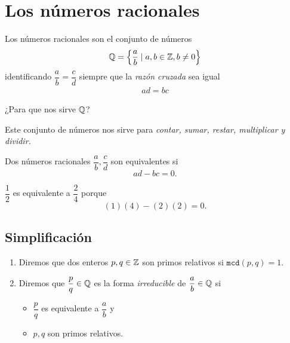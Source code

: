 
\section{Los números racionales}


	Los números racionales son el conjunto de números
	$$
	\mathbb{Q}=\left\{ \frac{a}{b} \mid a,b \in \mathbb{Z}, b\neq 0 \right\} 
	$$
identificando $\dfrac{a}{b}=\dfrac{c}{d}$ siempre que la \emph{razón cruzada} sea igual
\begin{align*}
ad=bc
\end{align*}




	¿Para que nos sirve $\mathbb{Q}$? 
	
	Este conjunto de números nos sirve para \emph{contar, sumar, restar, multiplicar y dividir.}



	\begin{defn}
		\label{rat:equiv}
		Dos números racionales $\dfrac{a}{b},\dfrac{c}{d}$ son equivalentes si
		$$
		ad-bc=0.
		$$
	\end{defn}

{}

	\begin{problema}
		$\dfrac{1}{2}$ es equivalente a $\dfrac{2}{4}$ porque
		$$
		\left( 1 \right)\left( 4 \right)-\left( 2 \right)\left( 2 \right)=0.
		$$
	\end{problema}
	


\subsection{Simplificaci\'on}

 
	\begin{defn}
		\begin{enumerate}
			\item Diremos que dos enteros $p,q\in \mathbb{Z}$ son primos relativos si $\texttt{mcd}(p,q)=1.$ 
			\item Diremos que $\dfrac{p}{q}\in \mathbb{Q}$ es la forma \emph{irreducible} de $\dfrac{a}{b}\in \mathbb{Q}$ si 
			\begin{itemize}
				\item $\dfrac{p}{q}$ es equivalente a $\dfrac{a}{b}$ y
				\item $p,q$ son primos relativos.
			\end{itemize}
			
		\end{enumerate}
		
	\end{defn}
	





